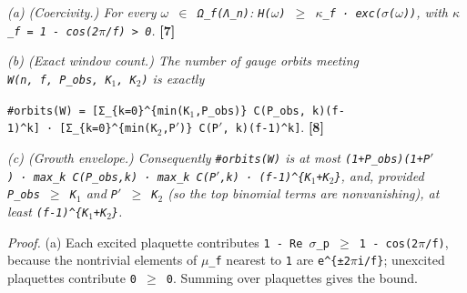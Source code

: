 \documentclass[
  american,
  11pt,
  letterpaper,
]{article}
\begin{document}
\emph{(a) (Coercivity.) For every \texttt{\ensuremath{\omega}\ \ensuremath{\in}\ Ω\_f(Λ\_n)}: \texttt{H(\ensuremath{\omega})\ \ensuremath{\geq}\ \ensuremath{\kappa}\_f\ ·\ exc(\ensuremath{\sigma}(\ensuremath{\omega}))}, with \texttt{\ensuremath{\kappa}\_f\ =\ 1\ -\ cos(2\ensuremath{\pi}/f)\ \textgreater{}\ 0}.} \textbf{{[}7{]}}

\emph{(b) (Exact window count.) The number of gauge orbits meeting \texttt{W(n,\ f,\ P\_obs,\ K\ensuremath{{}_{1}},\ K\ensuremath{{}_{2}})} is exactly}

\texttt{\#orbits(W)\ =\ {[}Σ\_\{k=0\}\^{}\{min(K\ensuremath{{}_{1}},\textbar{}P\_obs\textbar{})\}\ C(\textbar{}P\_obs\textbar{},\ k)(f-1)\^{}k{]}\ ·\ {[}Σ\_\{k=0\}\^{}\{min(K\ensuremath{{}_{2}},\textbar{}P\ensuremath{'}\textbar{})\}\ C(\textbar{}P\ensuremath{'}\textbar{},\ k)(f-1)\^{}k{]}}. \textbf{{[}8{]}}

\emph{(c) (Growth envelope.) Consequently \texttt{\#orbits(W)} is at most \texttt{(1+\textbar{}P\_obs\textbar{})(1+\textbar{}P\ensuremath{'}\textbar{})\ ·\ max\_k\ C(\textbar{}P\_obs\textbar{},k)\ ·\ max\_k\ C(\textbar{}P\ensuremath{'}\textbar{},k)\ ·\ (f-1)\^{}\{K\ensuremath{{}_{1}}+K\ensuremath{{}_{2}}\}}, and, provided \texttt{\textbar{}P\_obs\textbar{}\ \ensuremath{\geq}\ K\ensuremath{{}_{1}}} and \texttt{\textbar{}P\ensuremath{'}\textbar{}\ \ensuremath{\geq}\ K\ensuremath{{}_{2}}} (so the top binomial terms are nonvanishing), at least \texttt{(f-1)\^{}\{K\ensuremath{{}_{1}}+K\ensuremath{{}_{2}}\}}.}

\emph{Proof.} (a) Each excited plaquette contributes \texttt{1\ -\ Re\ \ensuremath{\sigma}\_p\ \ensuremath{\geq}\ 1\ -\ cos(2\ensuremath{\pi}/f)}, because the nontrivial elements of \texttt{\ensuremath{\mu}\_f} nearest to \texttt{1} are \texttt{e\^{}\{±2\ensuremath{\pi}i/f\}}; unexcited plaquettes contribute \texttt{0\ \ensuremath{\geq}\ 0}. Summing over plaquettes gives the bound.
\end{document}
